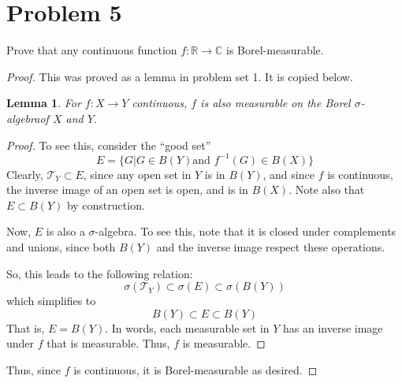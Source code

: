 \documentclass[fontsize=11pt]{scrartcl} %
\numberwithin{equation}{section} %
\numberwithin{figure}{section} %
\numberwithin{table}{section} %
\newcommand{\R}{\mathbb{R}}
\newcommand{\C}{\mathbb{C}}
\newcommand{\sigalg}{$\sigma$-algebra}
\newtheorem*{lemma}{Lemma}
\begin{document}
\section*{Problem 5}
Prove that any continuous function $f:\R\to\C$ is Borel-measurable.
\\
\begin{proof}
This was proved as a lemma in problem set 1. It is copied below.

\begin{lemma}
For $f:X\to Y$ continuous, $f$ is also measurable on the Borel \sigalg of $X$ and $Y$.
\end{lemma}
\begin{proof}
To see this, consider the ``good set''
\[
E = \{G | G\in B(Y) \textrm{and } f^{-1}(G)\in B(X)\}
\]
Clearly, $\mathscr{T}_Y \subset E$, since any open set in $Y$ is in $B(Y)$, and since
$f$ is continuous, the inverse image of an open set is open, and is in $B(X)$.
Note also that $E\subset B(Y)$ by construction.

Now, $E$ is also a \sigalg. To see this, note that it is closed under complements and
unions, since both $B(Y)$ and the inverse image respect these operations.

So, this leads to the following relation:
\[
\sigma(\mathscr{T}_Y) \subset \sigma(E) \subset \sigma(B(Y))
\]
which simplifies to
\[
B(Y) \subset E \subset B(Y)
\]
That is, $E = B(Y)$. In words, each measurable set in $Y$ has an inverse image under $f$
that is measurable. Thus, $f$ is measurable.
\end{proof}

Thus, since $f$ is continuous, it is Borel-measurable as desired.
\end{proof}
\end{document}

